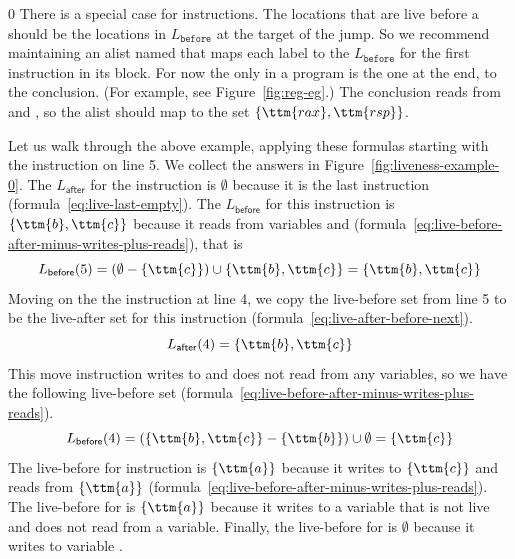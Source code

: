 \documentclass[7x10]{TimesAPriori_MIT}%
\def\racketEd{0}
\def\edition{1}
\begin{document}
{\if\edition\racketEd
There is a special case for  instructions.  The locations
that are live before a  should be the locations in
$L_{\mathtt{before}}$ at the target of the jump. So we recommend
maintaining an alist named  that maps each label to
the $L_{\mathtt{before}}$ for the first instruction in its block. For
now the only  in a \LangXVar{} program is the one at the
end, to the conclusion. (For example, see Figure~\ref{fig:reg-eg}.)
The conclusion reads from  and , so the alist should
map  to the set $\{\ttm{rax},\ttm{rsp}\}$.
\fi}

Let us walk through the above example, applying these formulas
starting with the instruction on line 5. We collect the answers in
Figure~\ref{fig:liveness-example-0}.  The $L_{\mathsf{after}}$ for the
 instruction is $\emptyset$ because it is the last
instruction (formula~\ref{eq:live-last-empty}).  The
$L_{\mathsf{before}}$ for this instruction is $\{\ttm{b},\ttm{c}\}$
because it reads from variables  and 
(formula~\ref{eq:live-before-after-minus-writes-plus-reads}), that is
\[
   L_{\mathsf{before}}(5) = (\emptyset - \{\ttm{c}\}) \cup \{ \ttm{b}, \ttm{c} \} = \{ \ttm{b}, \ttm{c} \}
\]
Moving on the the instruction  at line 4, we copy
the live-before set from line 5 to be the live-after set for this
instruction (formula~\ref{eq:live-after-before-next}).
\[
  L_{\mathsf{after}}(4) = \{ \ttm{b}, \ttm{c} \}
\]
This move instruction writes to  and does not read from any
variables, so we have the following live-before set
(formula~\ref{eq:live-before-after-minus-writes-plus-reads}).
\[
  L_{\mathsf{before}}(4) = (\{\ttm{b},\ttm{c}\} - \{\ttm{b}\}) \cup \emptyset = \{ \ttm{c} \}
\]
The live-before for instruction 
is $\{\ttm{a}\}$ because it writes to $\{\ttm{c}\}$ and reads from $\{\ttm{a}\}$
(formula~\ref{eq:live-before-after-minus-writes-plus-reads}).  The
live-before for  is $\{\ttm{a}\}$ because it writes to a
variable that is not live and does not read from a variable.
Finally, the live-before for  is $\emptyset$
because it writes to variable .
\end{document}
